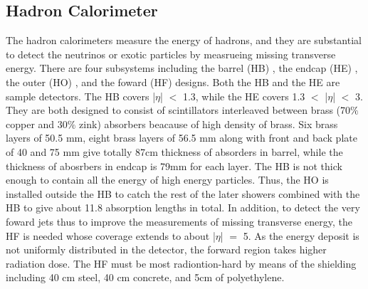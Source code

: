 \subsection{Hadron Calorimeter} 
The hadron calorimeters measure the energy of hadrons, and they are substantial to detect the neutrinos or exotic particles by measrueing missing transverse energy.
There are four subsystems including the barrel (HB) , the endcap (HE) , the outer (HO) , and the foward (HF) designs.
Both the HB and the HE are sample detectors. 
The HB covers |$\eta $| $<$ 1.3, while the HE covers 1.3 $<$ |$\eta $| $<$ 3.
They are both designed to consist of scintillators interleaved between brass (70$\% $ copper and 30$\% $ zink) absorbers beacause of high density of brass.
Six brass layers of 50.5 mm, eight brass layers of 56.5 mm along with front and back plate of 40 and 75 mm give totally 87cm thickness of absorders in barrel, while the thickness of abosrbers in endcap is 79mm for each layer.
The HB is not thick enough to contain all the energy of high energy particles.
Thus, the HO is installed outside the HB to catch the rest of the later showers combined with the HB to give about 11.8 absorption lengths in total.
In addition, to detect the very foward jets thus to improve the measurements of missing transverse energy, the HF is needed whose coverage extends to about |$\eta $| $=$ 5.
As the energy deposit is not uniformly distributed in the detector, the forward region takes higher radiation dose.
The HF must be most radiontion-hard by means of the shielding including 40 cm steel, 40 cm concrete, and 5cm of polyethylene.  



